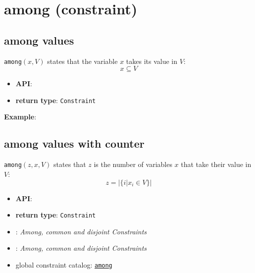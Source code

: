 \label{among}
\hypertarget{among}{}

\section{among (constraint)}\label{among:amongconstraint}\hypertarget{among:amongconstraint}{}

\subsection{among values}\label{among:amongvalues}\hypertarget{among:amongvalues}{}

\begin{notedef}
  \texttt{among}$(x, V)$ states that the variable $x$ takes its value in $V$:
 $$x \subseteq V$$  
\end{notedef}

\begin{itemize}
	\item \textbf{API}: 
	\item \textbf{return type}: \texttt{Constraint}
\end{itemize}

\textbf{Example}:


\subsection{among values with counter}\label{among:amongvaluescounter}\hypertarget{among:amongvaluescounter}{}

\begin{notedef}
  \texttt{among}$(z, x, V)$ states that $z$ is the number of variables $x$ that take their value in $V$:
 $$ z = \vert\lbrace i | x_i \in V \rbrace\vert $$  
\end{notedef}

\begin{itemize}
	\item \textbf{API}: 
	\item \textbf{return type}: \texttt{Constraint}
	\item  \cite{Bessiere05ERCIM}: \emph{\textit{Among}, \textit{common} and \textit{disjoint} Constraints}
	\item  \cite{Bessiere06ERCIM}: \emph{\textit{Among}, \textit{common} and \textit{disjoint} Constraints}
	\item global constraint catalog: \href{http://www.emn.fr/x-info/sdemasse/gccat/Camong.html}{\tt among}
\end{itemize}

